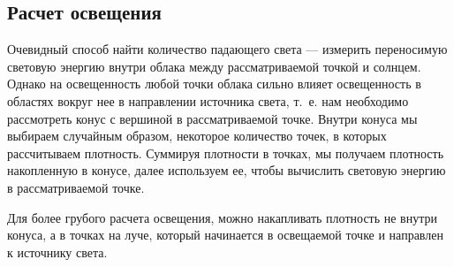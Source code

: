 \subsection{Расчет освещения}
Очевидный способ найти количество падающего света — измерить переносимую световую энергию внутри облака между рассматриваемой точкой и солнцем. Однако на освещенность любой точки облака сильно влияет освещенность в областях вокруг нее в направлении источника света, т.~е. нам необходимо рассмотреть конус с вершиной в рассматриваемой точке. Внутри конуса мы выбираем случайным образом, некоторое количество точек, в которых рассчитываем плотность. Суммируя плотности в точках, мы получаем плотность накопленную в конусе, далее используем ее, чтобы вычислить световую энергию в рассматриваемой точке.

Для более грубого расчета освещения, можно накапливать плотность не внутри конуса, а в точках на луче, который начинается в освещаемой точке и направлен к источнику света. 


